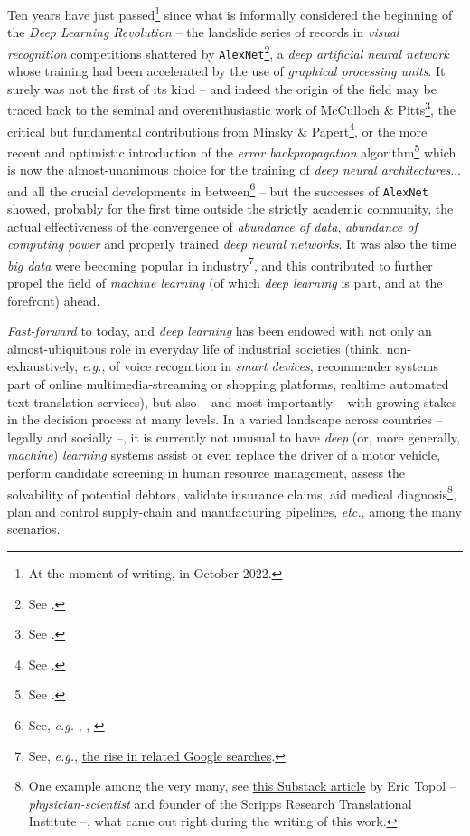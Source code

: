 

Ten years have just passed\footnote{At the moment of writing, in October 2022.} since what is informally considered the beginning of the \textit{Deep Learning Revolution} -- the landslide series of records in \textit{visual recognition} competitions shattered by \texttt{AlexNet}\footnote{See \cite{KrizhevskyEtAl2012AlexNet}.}, a \textit{deep artificial neural network} whose training had been accelerated by the use of \textit{graphical processing units}. It surely was not the first of its kind -- and indeed the origin of the field may be traced back to the seminal and overenthusiastic work of McCulloch \& Pitts\footnote{See \cite{McCullochPitts1990ALC}.}, the critical but fundamental contributions from Minsky \& Papert\footnote{See \cite{MinskyPapert1969Perceptrons}.}, or the more recent and optimistic introduction of the \textit{error backpropagation} algorithm\footnote{See \cite{RumelhartEtAl1986LearningRB}.} which is now the almost-unanimous choice for the training of \textit{deep neural architectures}... and all the crucial developments in between\footnote{See, \textit{e.g.} \cite{Hebb1949Organization}, \cite{Rosenblatt1958ThePA}, \cite{Hopfield1982Neural}} -- but the successes of \texttt{AlexNet} showed, probably for the first time outside the strictly academic community, the actual effectiveness of the convergence of \textit{abundance of data}, \textit{abundance of computing power} and properly trained \textit{deep neural networks}. It was also the time \textit{big data} were becoming popular in industry\footnote{See, \textit{e.g.}, \href{https://trends.google.com/trends/explore?date=all\&q=big\%20data,Deep\%20learning}{the rise in related Google searches}.}, and this contributed to further propel the field of \textit{machine learning} (of which \textit{deep learning} is part, and at the forefront) ahead.

\textit{Fast-forward} to today, and \textit{deep learning} has been endowed with not only an almost-ubiquitous role in everyday life of industrial societies (think, non-exhaustively, \textit{e.g.}, of voice recognition in \textit{smart devices}, recommender systems part of online multimedia-streaming or shopping platforms, realtime automated text-translation services), but also -- and most importantly -- with growing stakes in the decision process at many levels. In a varied landscape across countries -- legally and socially --, it is currently not unusual to have \textit{deep} (or, more generally, \textit{machine}) \textit{learning} systems assist or even replace the driver of a motor vehicle, perform candidate screening in human resource management, assess the solvability of potential debtors, validate insurance claims, aid medical diagnosis\footnote{One example among the very many, see \href{https://erictopol.substack.com/p/the-amazing-power-of-machine-eyes}{this Substack article} by Eric Topol -- \textit{physician-scientist} and founder of the Scripps Research Translational Institute --, what came out right during the writing of this work.}, plan and control supply-chain and manufacturing pipelines, \textit{etc.}, among the many scenarios.

